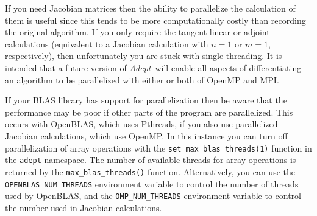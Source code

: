 \documentclass[a4,oneside]{book}
\def\codesize{\small}
\def\Adept{\emph{Adept}}
\def\code#1{{\codesize\texttt{#1}}}
\begin{document}
If you need Jacobian matrices then the ability to parallelize the
calculation of them is useful since this tends to be more
computationally costly than recording the original algorithm.  If you
only require the tangent-linear or adjoint calculations (equivalent to
a Jacobian calculation with $n=1$ or $m=1$, respectively), then
unfortunately you are stuck with single threading. It is intended that
a future version of \Adept\ will enable all aspects of differentiating
an algorithm to be parallelized with either or both of OpenMP and MPI.

If your BLAS library has support for parallelization then be aware
that the performance may be poor if other parts of the program are
parallelized.  This occurs with OpenBLAS, which uses Pthreads, if you
also use parallelized Jacobian calculations, which use OpenMP.  In
this instance you can turn off parallelization of array operations
with the \code{set\_max\_blas\_threads(1)} function in the
\code{adept} namespace.  The number of available threads for array
operations is returned by the \code{max\_blas\_threads()} function.
Alternatively, you can use the \code{OPENBLAS\_NUM\_THREADS}
environment variable to control the number of threads used by
OpenBLAS, and the \code{OMP\_NUM\_THREADS} environment variable to
control the number used in Jacobian calculations.
\end{document}
